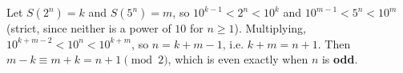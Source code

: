 Let $S\left(2^n\right)=k$ and $S\left(5^n\right)=m$, so $10^{k-1}<2^n<10^k$ and $10^{m-1}<5^n<10^m$ (strict, since neither is a power of $10$ for $n\ge1$). Multiplying, $10^{k+m-2}<10^n<10^{k+m}$, so $n=k+m-1$, i.e. $k+m=n+1$. Then $m-k\equiv m+k=n+1\pmod2$, which is even exactly when $n$ is \textbf{odd}.
